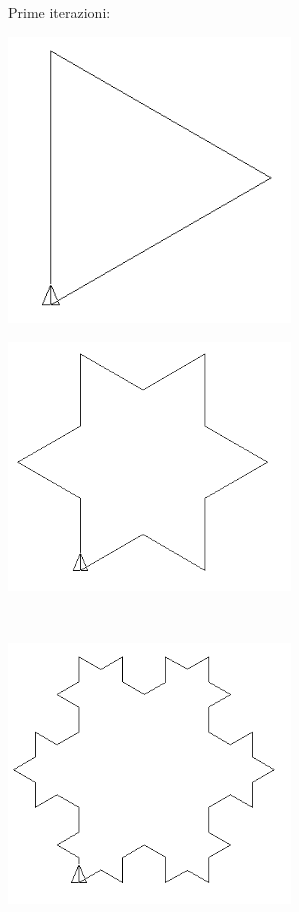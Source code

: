 Prime iterazioni:
\begin{center}
	\begin{minipage}{7.5cm}
		\includegraphics[width=7.5cm]{pics/linden-flocon1.png}
	\end{minipage}
	\begin{minipage}{7.5cm}
		\includegraphics[width=7.5cm]{pics/linden-flocon2.png}
	\end{minipage}\\
	\begin{minipage}{7.5cm}
		\includegraphics[width=7.5cm]{pics/linden-flocon3.png}

\end{minipage}
\end{center}
